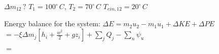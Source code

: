 \( \Delta m_{12} \, ? \)  
\( T_1 = 100^\circ \, C \), \( T_2 = 70^\circ \, C \)  
\( T_{ein,12} = 20^\circ \, C \)  

Energy balance for the system:  
\( \Delta E = m_2 u_2 - m_1 u_1 + \Delta KE + \Delta PE \)  
\( = -\xi \Delta m_j \left[ h_i + \frac{w^2}{2} + g z_i \right] + \sum_j Q_j - \sum_n \psi_u \)  

\( = \)
